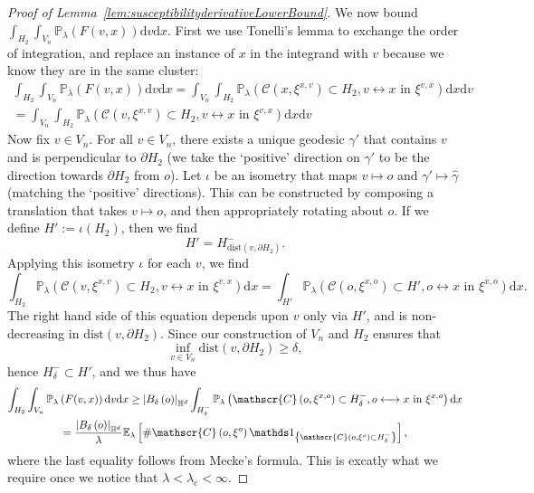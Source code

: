 \documentclass[10pt,a4paper,dvipsnames]{article}
\theoremstyle{definition}
\theoremstyle{remark}
\newcommand{\pla}{\mathbb P_\lambda}
\newcommand{\ela}{\mathbb E_{\lambda}}
\newcommand{\HypDim}{{\mathbb{H}^d}}
\newcommand{\dd}{\mathrm{d}} %
\newcommand{\C}{\mathscr {C}}
\newcommand{\conn}[3]{#1 \longleftrightarrow #2\textrm { in } #3}
\newcommand{\Id}{\mathds 1}
\DeclarePairedDelimiter\abs{\lvert}{\rvert}
\newcommand{\habsd}[1]{\abs*{#1}_\HypDim}
\newcommand{\dist}[1]{\mathrm{dist}\left(#1\right)}
\newcommand{\orig}{o}
\numberwithin{equation}{section}
\begin{document}
\begin{proof}[Proof of Lemma~\ref{lem:susceptibilityderivativeLowerBound}]
    We now bound $\int_{H_2}\int_{V_n}\pla\left(F(v,x)\right)\dd v\dd x$. First we use Tonelli's lemma to exchange the order of integration, and replace an instance of $x$ in the integrand with $v$ because we know they are in the same cluster:
    \begin{multline}
        \int_{H_2}\int_{V_n}\pla\left(F(v,x)\right)\dd v \dd x = \int_{V_n}\int_{H_2}\pla\left(\C\left(x,\xi^{x,v}\right)\subset  H_2,\conn{v}{x}{\xi^{v,x}}\right) \dd x\dd v\\ = \int_{V_n}\int_{H_2}\pla\left(\C\left(v,\xi^{x,v}\right)\subset  H_2,\conn{v}{x}{\xi^{v,x}}\right) \dd x\dd v
    \end{multline}
    Now fix $v\in V_n$. For all $v\in V_n$, there exists a unique geodesic $\gamma'$ that contains $v$ and is perpendicular to $\partial H_2$ (we take the `positive' direction on $\gamma'$ to be the direction towards $\partial H_2$ from $\orig$). Let $\iota$ be an isometry that maps $v\mapsto\orig$ and $\gamma'\mapsto\hat{\gamma}$ (matching the `positive' directions). This can be constructed by composing a translation that takes $v\mapsto\orig$, and then appropriately rotating about $\orig$. If we define $H':=\iota\left(H_2\right)$, then we find
    \begin{equation}
        H' = H^-_{\dist{v,\partial H_2}}.
    \end{equation}
    Applying this isometry $\iota$ for each $v$, we find
    \begin{equation}
        \int_{H_2}\pla\left(\C\left(v,\xi^{x,v}\right)\subset  H_2,\conn{v}{x}{\xi^{v,x}}\right) \dd x =\int_{H'}\pla\left(\C\left(\orig,\xi^{x,\orig}\right)\subset  H',\conn{\orig}{x}{\xi^{x,\orig}}\right) \dd x.
    \end{equation}
    The right hand side of this equation depends upon $v$ only via $H'$, and is non-decreasing in $\dist{v,\partial H_2}$. Since our construction of $V_n$ and $H_2$ ensures that
    \begin{equation}
         \inf_{v\in V_n}\dist{v,\partial H_2} \geq \delta,
    \end{equation}
    hence $H^-_\delta\subset H'$, and we thus have 
    \begin{multline}\label{eqn:Fintegralbound}
        \int_{H_2}\int_{V_n}\pla\left(F(v,x)\right)\dd v \dd x \geq \habsd{B_\delta\left(\orig\right)}\int_{H^-_\delta}\pla\left(\C\left(\orig,\xi^{x,\orig}\right)\subset  H^-_\delta,\conn{\orig}{x}{\xi^{x,\orig}}\right) \dd x\\
        = \frac{\habsd{B_\delta\left(\orig\right)}}{\lambda}\ela\left[\#\C\left(\orig,\xi^{\orig}\right) \Id_{\left\{\C\left(\orig,\xi^{\orig}\right)\subset H^-_\delta\right\}}\right],
    \end{multline}
    where the last equality follows from Mecke's formula.
    This is excatly what we require once we notice that  $\lambda<\lambda_\mathrm{c}<\infty$.
    

\end{proof}
\end{document}
